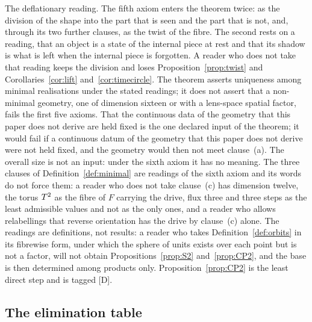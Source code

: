 \documentclass[11pt,a4paper]{article}
\theoremstyle{plain}
\theoremstyle{definition}
\theoremstyle{remark}
\newcommand{\rigD}{[\textup{D}]}
\begin{document}
The deflationary reading. The fifth axiom enters the theorem twice: as the division of the shape into the part that is seen and the part that is not, and, through its two further clauses, as the twist of the fibre. The second rests on a reading, that an object is a state of the internal piece at rest and that its shadow is what is left when the internal piece is forgotten. A reader who does not take that reading keeps the division and loses Proposition~\ref{prop:twist} and Corollaries~\ref{cor:lift} and~\ref{cor:timecircle}. The theorem asserts uniqueness among minimal realisations under the stated readings; it does not assert that a non-minimal geometry, one of dimension sixteen or with a lens-space spatial factor, fails the first five axioms. 
That the continuous data of the geometry that this paper does not derive are held fixed is the one declared input of the theorem; it would fail if a continuous datum of the geometry that this paper does not derive were not held fixed, and the geometry would then not meet clause~(a).
 The overall size is not an input: under the sixth axiom it has no meaning. The three clauses of Definition~\ref{def:minimal} are readings of the sixth axiom and its words do not force them: a reader who does not take clause~(c) has dimension twelve,
the torus $T^2$ as the fibre of $F$ carrying the drive,
flux three and three steps as the least admissible values and not as the only ones, and a reader who allows relabellings that reverse orientation has the drive by clause~(c) alone. The readings are definitions, not results: a reader who takes Definition~\ref{def:orbits} in its fibrewise form, under which the sphere of units exists over each point but is not a factor, will not obtain Propositions~\ref{prop:S2} and~\ref{prop:CP2}, and the base is then determined among products only. Proposition~\ref{prop:CP2} is the least direct step and is tagged \rigD.

\subsection{The elimination table}
\end{document}
